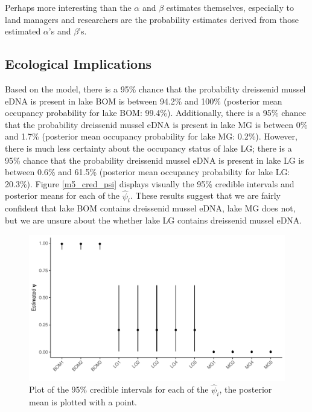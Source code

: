 \documentclass[12pt]{article}\usepackage[]{graphicx}\usepackage[]{color}
\makeatletter
\def\maxwidth{ %
  \ifdim\Gin@nat@width>\linewidth
    \linewidth
  \else
    \Gin@nat@width
  \fi
}
\newenvironment{knitrout}{}{} %
\def\maxwidth{ %
  \ifdim\Gin@nat@width>\linewidth
    \linewidth
  \else
    \Gin@nat@width
  \fi
}
\newenvironment{knitrout}{}{} %
\makeatother
\begin{document}
Perhaps more interesting than the $\alpha$ and $\beta$ estimates themselves, especially to land managers and researchers are the probability estimates derived from those estimated $\alpha$'s and $\beta$'s.

\subsection{Ecological Implications}

Based on the model, there is a 95\% chance that the probability dreissenid mussel eDNA is present in lake BOM is between 94.2\% and 100\% (posterior mean occupancy probability for lake BOM: 99.4\%). Additionally, there is a 95\% chance that the probability dreissenid mussel eDNA is present in lake MG is between 0\% and 1.7\% (posterior mean occupancy probability for lake MG: 0.2\%). However, there is much less certainty about the occupancy status of lake LG; there is a 95\% chance that the probability dreissenid mussel eDNA is present in lake LG is between 0.6\% and 61.5\% (posterior mean occupancy probability for lake LG: 20.3\%). Figure \ref{m5_cred_psi} displays visually the 95\% credible intervals and posterior means for each of the $\hat\psi_i$. These results suggest that we are fairly confident that lake BOM contains dreissenid mussel eDNA, lake MG does not, but we are unsure about the whether lake LG contains dreissenid mussel eDNA. 

\begin{figure}
\begin{knitrout}
\color{fgcolor}
\includegraphics[width=\maxwidth]{figure/m5_psi-1} 

\end{knitrout}
\caption{Plot of the 95\% credible intervals for each of the $\hat\psi_i$, the posterior mean is plotted with a point.}
\label{fig:m5_cred_psi}
\end{figure}
\end{document}
